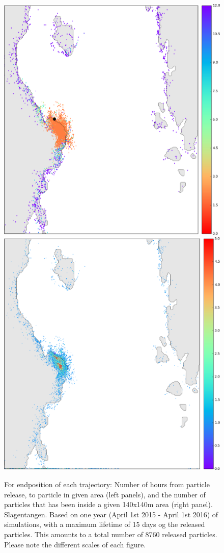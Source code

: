 \begin{figure}[ht]
\centerline{
\includegraphics*[width=.5\textwidth]{Figurer/opendrift/opendrift_slagen_shortest_time_zoom_endpos_crop}
\includegraphics*[width=.5\textwidth]{Figurer/opendrift/opendrift_slagen_consentration_zoom_endpos_crop}
}
\caption{\small
For endposition of each trajectory: Number of hours from particle release, to particle in given area (left panels), and the number of particles that has been inside a given 140x140m area (right panel). Slagentangen. Based on one year (April 1st 2015 - April 1st 2016) of simulations, with a maximum lifetime of 15 days og the released particles. This amounts to a total number of 8760 released particles. Please note the different scales of each figure.}
\label{fig:opendrift_slagen2}
\end{figure}
